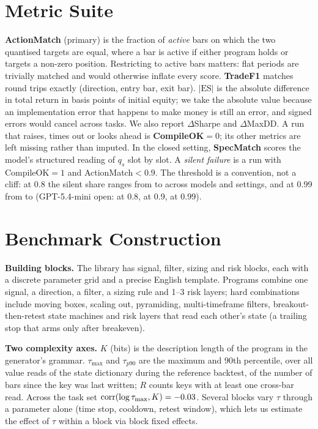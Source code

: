 \documentclass[sigconf,anonymous,review]{acmart}
\begin{document}
\section{Metric Suite}
\textbf{ActionMatch} (primary) is the fraction of \emph{active} bars on which the two quantised
targets are equal, where a bar is active if either program holds or targets a non-zero position.
Restricting to active bars matters: flat periods are trivially matched and would otherwise
inflate every score. \textbf{TradeF1} matches round trips exactly (direction, entry bar, exit bar).
$|\mathrm{ES}|$ is the absolute difference in total return in basis points of initial equity; we
take the absolute value because an implementation error that happens to make money is still an
error, and signed errors would cancel across tasks. We also report $\Delta$Sharpe and $\Delta$MaxDD.
A run that raises, times out or looks ahead is \textbf{CompileOK}$=0$; its other metrics are left
missing rather than imputed. In the closed setting, \textbf{SpecMatch} scores the model's
structured reading of $q_s$ slot by slot. A \emph{silent failure} is a run with CompileOK$=1$
and ActionMatch$<0.9$. The threshold is a convention, not a cliff: at 0.8 the silent share
ranges from \SilentEightyMin{} to \SilentEightyMax{} across models and settings, and at 0.99 from
\SilentNinetyNineMin{} to \SilentNinetyNineMax{} (GPT-5.4-mini open: \SilentGptOpenEighty{} at 0.8,
\SilentGptOpen{} at 0.9, \SilentGptOpenNinetyNine{} at 0.99).

\section{Benchmark Construction}
\textbf{Building blocks.} The library has \NBlocksSignal{} signal, \NBlocksFilter{} filter,
\NBlocksSizing{} sizing and \NBlocksRisk{} risk blocks, each
with a discrete parameter grid and a precise English template. Programs combine one signal,
a direction, a filter, a sizing rule and 1--3 risk layers; hard combinations include moving
boxes, scaling out, pyramiding, multi-timeframe filters, breakout-then-retest state machines and
risk layers that read each other's state (a trailing stop that arms only after breakeven).

\textbf{Two complexity axes.} $K$ (bits) is the description length of the program in the
generator's grammar. $\tau_{\max}$ and $\tau_{p90}$ are the maximum and 90th percentile, over all
value reads of the state dictionary during the reference backtest, of the number of bars since
the key was last written; $R$ counts keys with at least one cross-bar read. Across the task set
$\mathrm{corr}(\log\tau_{\max},K)=-0.03$. Several blocks vary $\tau$ through a parameter
alone (time stop, cooldown, retest window), which lets us estimate the effect of $\tau$ within a
block via block fixed effects.
\end{document}
